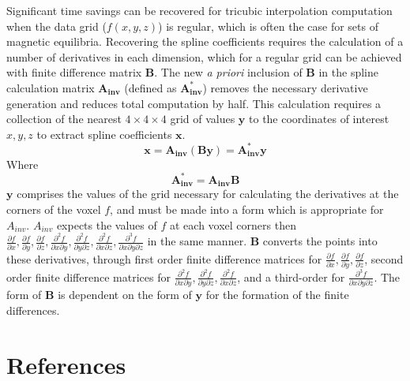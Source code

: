 \documentclass{elsarticle}
\begin{document}
Significant time savings can be recovered for tricubic interpolation computation when the data grid ($f(x,y,z)$) is regular, which is often the case for sets of magnetic equilibria. 
Recovering the spline coefficients requires the calculation of a number of derivatives in each dimension, which for a regular grid can be achieved with finite difference matrix $\boldsymbol{B}$. 
The new \emph{a priori} inclusion of $\boldsymbol{B}$ in the spline calculation matrix $\boldsymbol{A_{inv}}$ (defined as $\boldsymbol{A_{inv}^*}$) removes the necessary derivative generation and reduces total computation by half.
This calculation requires a collection of the nearest $4\times4\times4$ grid of values $\boldsymbol{y}$ to the coordinates of interest $x,y,z$ to extract spline coefficients $\boldsymbol{x}$.
\begin{equation}
\boldsymbol{x} = \boldsymbol{A_{inv}} ( \boldsymbol{B} \boldsymbol{y}) = \boldsymbol{A_{inv}^*}\boldsymbol{y}
\end{equation}
Where
\begin{equation}
\boldsymbol{A_{inv}^*} = \boldsymbol{A_{inv}}\boldsymbol{B} 
\end{equation}
 $\boldsymbol{y}$ comprises the values of the grid necessary for calculating the derivatives at the corners of the voxel $f$, and must be made into a form which is appropriate for $A_{inv}$. $A_{inv}$ expects the values of $f$ at each voxel corners then $\frac{\partial f}{\partial x}, \frac{\partial f}{\partial y}, \frac{\partial f}{\partial z}, \frac{\partial^2 f}{\partial x \partial y}, \frac{\partial^2 f}{\partial y \partial z}, \frac{\partial^2 f}{\partial x \partial z}, \frac{\partial^3 f}{\partial x \partial y \partial z}$ in the same manner. $\boldsymbol{B}$ converts the points into these derivatives, through first order finite difference matrices for $\frac{\partial f}{\partial x}, \frac{\partial f}{\partial y}, \frac{\partial f}{\partial z}$, second order finite difference matrices for $\frac{\partial^2 f}{\partial x \partial y}, \frac{\partial^2 f}{\partial y \partial z}, \frac{\partial^2 f}{\partial x \partial z}$, and a third-order for $\frac{\partial^3 f}{\partial x \partial y \partial z}$. The form of $\boldsymbol{B}$ is dependent on the form of $\boldsymbol{y}$ for the formation of the finite differences.

\section*{References}


\end{document}
